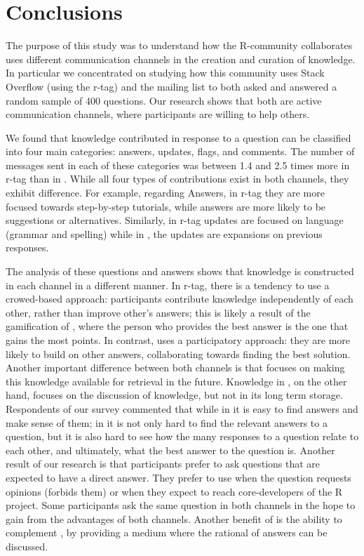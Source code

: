 \section{Conclusions}
\label{cha:conclusion}

The purpose of this study was to understand how the R-community collaborates uses different communication channels in the creation and curation of knowledge.
In particular we concentrated on studying how this community uses Stack Overflow (using the r-tag) and the \RH mailing list to both asked and answered
a random sample of 400 questions. Our research shows that both are active communication channels, where participants are willing to help others. 

We found that knowledge contributed in response to a question can be classified into four main categories: answers, updates, flags, and comments. The number of
messages sent in each of these categories was between 1.4 and 2.5 times more in \SO r-tag than in \RH. While all four types of contributions exist in both
channels, they exhibit difference. For example, regarding Answers, in \SO r-tag they are more focused towards step-by-step tutorials, while \RH answers are more
likely to be suggestions or alternatives. Similarly, in \SO r-tag updates are focused on language (grammar and spelling) while in \RH, the updates are
expansions on previous responses.

The analysis of these questions and answers shows that knowledge is constructed in each channel in a different manner. In \SO r-tag, there is a tendency to use
a crowed-based approach: participants contribute knowledge independently of each other, rather than improve other's answers; this is likely a result of the
gamification of \SO, where the person who provides the best answer is the one that gains the most points.
In contrast, \RH uses a participatory approach: they are more likely to build on other answers, collaborating towards finding the best solution.
Another important difference between both channels is that \SO focuses on making this knowledge available for retrieval in the future. Knowledge in \RH, on the
other hand, focuses on the discussion of knowledge, but not in its long term storage. Respondents of our survey commented that while in \SO it is easy to find answers
and make sense of them; in \RH it is not only hard to find the relevant answers to a question, but it is also hard to see how the many responses to a question
relate to each other, and ultimately, what the best answer to the question is.
Another result of our research is that participants prefer \SO to ask questions that are expected to have a direct answer. They prefer to use \RH when the
question requests opinions (\SO forbids them) or when they expect to reach core-developers of the R project. Some participants ask the same question in both
channels in the hope to gain from the advantages of both channels. Another benefit of \RH is the ability to complement \SO, by providing a medium where the rational
of answers can be discussed.

